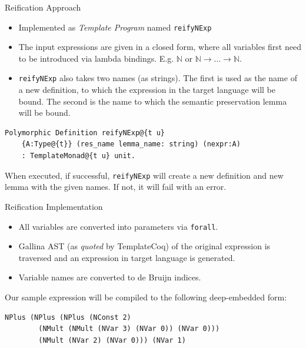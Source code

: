 \documentclass[aspectratio=169]{beamer}
\newcommand{\N}{\mathbb{N}}
\begin{document}
\begin{frame}[fragile]{Reification Approach}
  
  \begin{itemize}
  \item Implemented as \textit{Template Program} named \lstinline[language=Coq]{reifyNExp}
  \item The input expressions are given in a closed form, where all
    variables first need to be introduced via lambda
    bindings. E.g. $\mathbb{N}$ or
    $\N \rightarrow \ldots \rightarrow \N$.
  \item \lstinline[language=Coq]{reifyNExp} also takes two names (as strings). The first
    is used as the name of a new definition, to which the expression
    in the target language will be bound. The second is the name to
    which the semantic preservation lemma will be bound.
  \end{itemize}

  \begin{lstlisting}[language=Coq, mathescape=true, frame=single]
  Polymorphic Definition reifyNExp@{t u}
    {A:Type@{t}} (res_name lemma_name: string) (nexpr:A)
    : TemplateMonad@{t u} unit.
  \end{lstlisting}

  When executed, if successful, \lstinline[language=Coq]{reifyNExp} will create a new
  definition and new lemma with the given names. If not, it will fail
  with an error. 

\end{frame}


\begin{frame}[fragile]{Reification Implementation}
  
  \begin{itemize}
  \item All variables are converted into parameters via \lstinline[language=Coq]{forall}.
  \item Gallina AST (as \textit{quoted} by TemplateCoq) of the
    original expression is traversed and an expression in target
    language is generated.
  \item Variable names are converted to de Bruijn indices.
  \end{itemize}
  \medskip
  Our sample expression will be compiled to the following
  deep-embedded form:
  
    \begin{lstlisting}[language=Coq, mathescape=true,frame=single]
    NPlus (NPlus (NPlus (NConst 2)
        (NMult (NMult (NVar 3) (NVar 0)) (NVar 0)))
        (NMult (NVar 2) (NVar 0))) (NVar 1)
  \end{lstlisting}

\end{frame}
\end{document}
